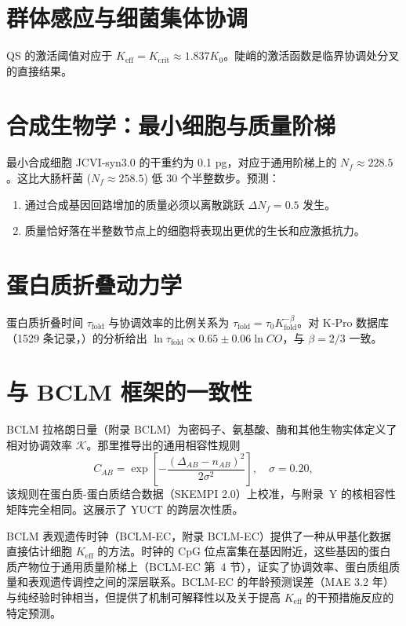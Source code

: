 \documentclass[11pt,a4paper]{article}
\newcommand{\REL}{\mathcal{K}}
\begin{document}
	\section{群体感应与细菌集体协调}
	
	QS 的激活阈值对应于 \(K_{\text{eff}} = K_{\mathrm{crit}} \approx 1.837 K_0\)。陡峭的激活函数是临界协调处分叉的直接结果。
	
	\section{合成生物学：最小细胞与质量阶梯}
	
	最小合成细胞 JCVI‑syn3.0 的干重约为 0.1 pg，对应于通用阶梯上的 \(N_f \approx 228.5\) \cite{Hutchison2016, Pelletier2023}。这比大肠杆菌 (\(N_f \approx 258.5\)) 低 30 个半整数步。预测：
	\begin{enumerate}
		\item 通过合成基因回路增加的质量必须以离散跳跃 \(\Delta N_f = 0.5\) 发生。
		\item 质量恰好落在半整数节点上的细胞将表现出更优的生长和应激抵抗力。
	\end{enumerate}
	
	\section{蛋白质折叠动力学}
	
	蛋白质折叠时间 \(\tau_{\text{fold}}\) 与协调效率的比例关系为 \(\tau_{\text{fold}} = \tau_0 K_{\text{fold}}^{-\beta}\)。对 K‑Pro 数据库（1529 条记录，\cite{Turina2023}）的分析给出 \(\ln \tau_{\text{fold}} \propto 0.65 \pm 0.06 \ln CO\)，与 \(\beta=2/3\) 一致。
	
	\section{与 BCLM 框架的一致性}
	
	BCLM 拉格朗日量（附录 BCLM）为密码子、氨基酸、酶和其他生物实体定义了相对协调效率 \(\REL\)。那里推导出的通用相容性规则
	\[
	C_{AB} = \exp\!\left[-\frac{(\Delta_{AB}-n_{AB})^2}{2\sigma^2}\right],\quad \sigma=0.20,
	\]
	该规则在蛋白质-蛋白质结合数据（SKEMPI 2.0）上校准，与附录~Y 的核相容性矩阵完全相同。这展示了 YUCT 的跨层次性质。
	
	BCLM 表观遗传时钟（BCLM-EC，附录 BCLM-EC）提供了一种从甲基化数据直接估计细胞 \(K_{\mathrm{eff}}\) 的方法。时钟的 CpG 位点富集在基因附近，这些基因的蛋白质产物位于通用质量阶梯上（BCLM-EC 第~4 节），证实了协调效率、蛋白质组质量和表观遗传调控之间的深层联系。BCLM-EC 的年龄预测误差（MAE 3.2 年）与纯经验时钟相当，但提供了机制可解释性以及关于提高 \(K_{\mathrm{eff}}\) 的干预措施反应的特定预测。
	
\end{document}
